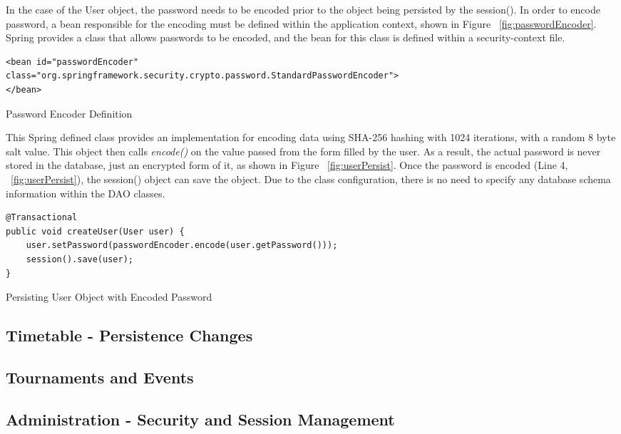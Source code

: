 In the case of the User object, the password needs to be encoded prior to the object being persisted by the session(). In order to encode password, a bean responsible for the encoding must be defined within the application context, shown in Figure ~\ref{fig:passwordEncoder}. Spring provides a class that allows passwords to be encoded, and the bean for this class is defined within a security-context file.

\begin{table}[H]
\begin{lstlisting}
<bean id="passwordEncoder"
class="org.springframework.security.crypto.password.StandardPasswordEncoder">
</bean>
\end{lstlisting}
\caption{Password Encoder Definition}
\label{fig:passwordEncoder}
\end{table}

This Spring defined class provides an implementation for encoding data using SHA-256 hashing with 1024 iterations, with a random 8 byte salt value. This object then calls \textit{encode()} on the value passed from the form filled by the user. As a result, the actual password is never stored in the database, just an encrypted form of it, as shown in Figure ~\ref{fig:userPersist}. Once the password is encoded (Line 4, ~\ref{fig:userPersist}), the session() object can save the object. Due to the class configuration, there is no need to specify any database schema information within the DAO classes.

\begin{table}[H]
\begin{lstlisting}
@Transactional
public void createUser(User user) {
	user.setPassword(passwordEncoder.encode(user.getPassword()));
	session().save(user);
}
\end{lstlisting}
\caption{Persisting User Object with Encoded Password}
\label{fig:userPersist}
\end{table}



\subsection{Timetable - Persistence Changes}
\subsection{Tournaments and Events}
\subsection{Administration - Security and Session Management}

